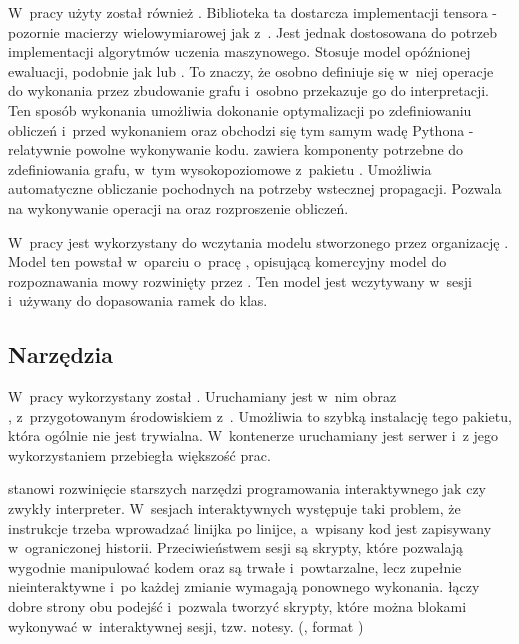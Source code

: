 W~pracy użyty został również . Biblioteka ta dostarcza
implementacji tensora - pozornie macierzy wielowymiarowej jak z~. Jest jednak
dostosowana do potrzeb implementacji algorytmów uczenia maszynowego. Stosuje model opóźnionej
ewaluacji, podobnie jak  lub . To znaczy, że
osobno definiuje się w~niej operacje do wykonania przez zbudowanie grafu i~osobno przekazuje go do interpretacji.
Ten sposób wykonania umożliwia dokonanie optymalizacji po zdefiniowaniu obliczeń i~przed wykonaniem oraz
obchodzi się tym samym wadę Pythona - relatywnie powolne wykonywanie kodu.
 zawiera komponenty potrzebne do zdefiniowania grafu, w~tym wysokopoziomowe
z~pakietu . Umożliwia automatyczne obliczanie pochodnych na potrzeby wstecznej propagacji.
Pozwala na wykonywanie operacji na  oraz rozproszenie obliczeń.

W~pracy  jest wykorzystany do wczytania modelu stworzonego przez organizację .
Model ten powstał w~oparciu o~pracę \cite{deepSpeechScaling},
opisującą komercyjny model do rozpoznawania mowy rozwinięty przez .
Ten model jest wczytywany w~sesji  i~używany do dopasowania ramek do klas.

\subsection{Narzędzia}

W~pracy wykorzystany został . Uruchamiany jest w~nim obraz \\ ,
z~przygotowanym środowiskiem z~. Umożliwia to szybką instalację tego pakietu, która ogólnie nie
jest trywialna. W~kontenerze uruchamiany jest serwer  i~z jego wykorzystaniem przebiegła większość prac.

 stanowi rozwinięcie starszych narzędzi programowania interaktywnego jak  czy zwykły  interpreter. W~sesjach interaktywnych występuje taki problem, że instrukcje trzeba wprowadzać linijka po linijce, a~wpisany kod jest zapisywany w~ograniczonej historii. Przeciwieństwem sesji są skrypty, które pozwalają wygodnie manipulować
kodem oraz są trwałe i~powtarzalne, lecz zupełnie nieinteraktywne i~po każdej zmianie wymagają ponownego wykonania.
 łączy dobre strony obu podejść i~pozwala tworzyć skrypty, które można blokami wykonywać
w~interaktywnej sesji, tzw. notesy. (, format )

